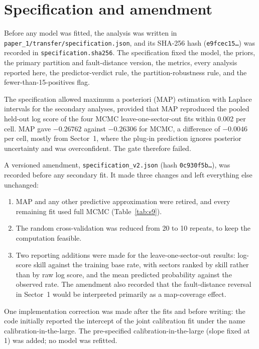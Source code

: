 \documentclass[11pt]{article}
\begin{document}
\section{Specification and amendment}
\label{sec:s2}

Before any model was fitted, the analysis was written in \texttt{paper\_1/transfer/specification.json}, and its SHA-256 hash (\texttt{e9fcec15\ldots}) was recorded in \texttt{specification.sha256}. The specification fixed the model, the priors, the primary partition and fault-distance version, the metrics, every analysis reported here, the predictor-verdict rule, the partition-robustness rule, and the fewer-than-15-positives flag.

The specification allowed maximum a posteriori (MAP) estimation with Laplace intervals for the secondary analyses, provided that MAP reproduced the pooled held-out log score of the four MCMC leave-one-sector-out fits within 0.002 per cell. MAP gave $-0.26762$ against $-0.26306$ for MCMC, a difference of $-0.0046$ per cell, mostly from Sector~1, where the plug-in prediction ignores posterior uncertainty and was overconfident. The gate therefore failed.

A versioned amendment, \texttt{specification\_v2.json} (hash \texttt{0c930f5b\ldots}), was recorded before any secondary fit. It made three changes and left everything else unchanged:
\begin{enumerate}
\item MAP and any other predictive approximation were retired, and every remaining fit used full MCMC (Table~\ref{tab:s9}).
\item The random cross-validation was reduced from 20 to 10 repeats, to keep the computation feasible.
\item Two reporting additions were made for the leave-one-sector-out results: log-score skill against the training base rate, with sectors ranked by skill rather than by raw log score, and the mean predicted probability against the observed rate. The amendment also recorded that the fault-distance reversal in Sector~1 would be interpreted primarily as a map-coverage effect.
\end{enumerate}
One implementation correction was made after the fits and before writing: the code initially reported the intercept of the joint calibration fit under the name calibration-in-the-large. The pre-specified calibration-in-the-large (slope fixed at 1) was added; no model was refitted.
\end{document}
